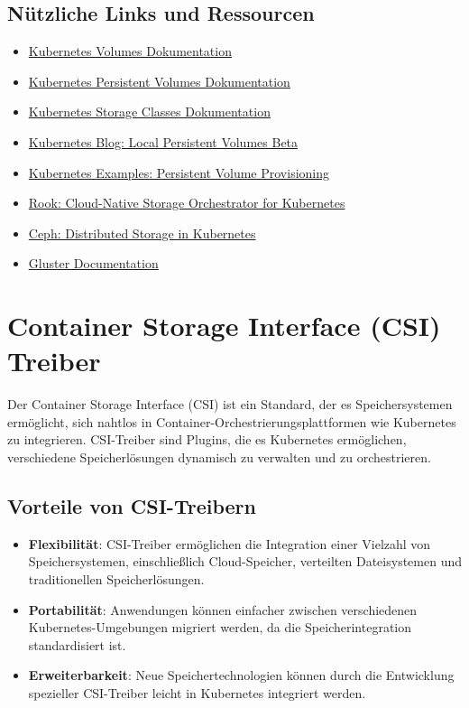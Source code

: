 \subsection{Nützliche Links und Ressourcen}
\begin{itemize}
    \item \href{https://kubernetes.io/docs/concepts/storage/volumes/}{Kubernetes Volumes Dokumentation}
    \item \href{https://kubernetes.io/docs/concepts/storage/persistent-volumes/}{Kubernetes Persistent Volumes Dokumentation}
    \item \href{https://kubernetes.io/docs/concepts/storage/storage-classes/}{Kubernetes Storage Classes Dokumentation}
    \item \href{https://kubernetes.io/blog/2018/04/13/local-persistent-volumes-beta/}{Kubernetes Blog: Local Persistent Volumes Beta}
    \item \href{https://github.com/kubernetes/examples/tree/master/staging/persistent-volume-provisioning/}{Kubernetes Examples: Persistent Volume Provisioning}
    \item \href{https://rook.io/}{Rook: Cloud-Native Storage Orchestrator for Kubernetes}
    \item \href{https://ceph.io/}{Ceph: Distributed Storage in Kubernetes}
    \item \href{https://docs.gluster.org}{Gluster Documentation}
\end{itemize}


\section{Container Storage Interface (CSI) Treiber}
Der Container Storage Interface (CSI) ist ein Standard, der es Speichersystemen ermöglicht, sich nahtlos in Container-Orchestrierungsplattformen wie Kubernetes zu integrieren. CSI-Treiber sind Plugins, die es Kubernetes ermöglichen, verschiedene Speicherlösungen dynamisch zu verwalten und zu orchestrieren.

\subsection{Vorteile von CSI-Treibern}
\begin{itemize}
    \item \textbf{Flexibilität}: CSI-Treiber ermöglichen die Integration einer Vielzahl von Speichersystemen, einschließlich Cloud-Speicher, verteilten Dateisystemen und traditionellen Speicherlösungen.
    \item \textbf{Portabilität}: Anwendungen können einfacher zwischen verschiedenen Kubernetes-Umgebungen migriert werden, da die Speicherintegration standardisiert ist.
    \item \textbf{Erweiterbarkeit}: Neue Speichertechnologien können durch die Entwicklung spezieller CSI-Treiber leicht in Kubernetes integriert werden.
\end{itemize}

